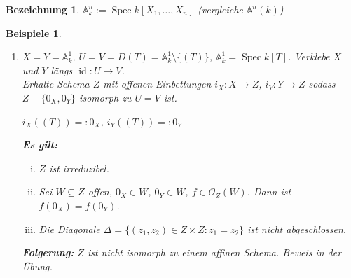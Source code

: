 \documentclass[a4paper, 12pt, numbers=noendperiod, chapterprefix=true]{scrbook}
\theoremstyle{break}
\newtheorem{Bez}[Def]{Bezeichnung}
\theoremstyle{nonumberbreak}
\newtheorem{bspe}{Beispiele}
\theoremstyle{nonumberplain}
\DeclareMathOperator{\Spec}{Spec}
\DeclareMathOperator{\id}{id}
\newcommand{\A}{\mathbb{A}}
\newcommand{\calO}{\mathcal{O}}
\begin{document}
\begin{Bez}
$\A_k^n := \Spec k[X_1,\ldots ,X_n]$ (vergleiche $\A^n(k)$)
\end{Bez}

\begin{bspe}\begin{enumerate}[1)]\item[2)]
$X=Y=\A_k^1$, $U=V=D(T) = \A_k^1 \setminus \{(T)\}$, $\A_k^1 = \Spec k[T]$. Verklebe $X$ und $Y$ l\"angs $\id: U\to V$.\\
Erhalte Schema $Z$ mit offenen Einbettungen $i_X: X\to Z$, $i_Y: Y \to Z$ sodass $Z - \{ 0_X, 0_Y\}$ isomorph zu $U=V$ ist.
\begin{center}
$i_X\left((T)\right) =: 0_X$, $i_Y\left((T)\right) =: 0_Y$
\end{center}

\textbf{Es gilt:}\begin{enumerate}[(i)]
\item
	$Z$ ist irreduzibel.
\item
	Sei $W \subseteq Z$ offen, $0_X \in W$, $0_Y \in W$, $f\in \calO_Z(W)$. Dann ist $f(0_X) = f(0_Y)$.
\item
	Die Diagonale $\Delta = \{ (z_1,z_2) \in Z\times Z: z_1 = z_2\}$ ist nicht abgeschlossen.
\end{enumerate}
\textbf{Folgerung:} $Z$ ist nicht isomorph zu einem affinen Schema. Beweis in der \"Ubung.
\end{enumerate}\end{bspe}
\end{document}
